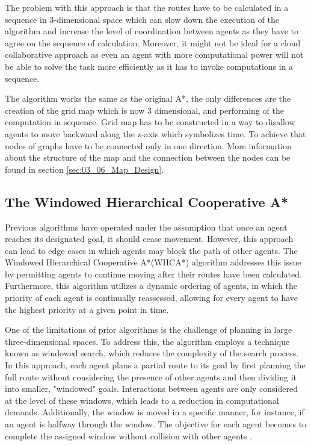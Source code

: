 The problem with this approach is that the routes have to be calculated in a sequence in 3-dimensional space which can slow down the execution of the algorithm and increase the level of coordination between agents as they have to agree on the sequence of calculation. Moreover, it might not be ideal for a cloud collaborative approach as even an agent with more computational power will not be able to solve the task more efficiently as it has to invoke computations in a sequence.

The algorithm works the same as the original A*, the only differences are the creation of the grid map which is now 3 dimensional, and  performing of the computation in sequence. Grid map has to be constructed in a way to disallow agents to move backward along the z-axis which symbolizes time. To achieve that nodes of graphs have to be connected only in one direction. More information about the structure of the map and the connection between the nodes can be found in section \ref{sec:03_06_Map_Design}.

\subsection{The Windowed Hierarchical Cooperative A*}
Previous algorithms have operated under the assumption that once an agent reaches its designated goal, it should cease movement. However, this approach can lead to edge cases in which agents may block the path of other agents. The Windowed Hierarchical Cooperative A*(WHCA*) algorithm addresses this issue by permitting agents to continue moving after their routes have been calculated. Furthermore, this algorithm utilizes a dynamic ordering of agents, in which the priority of each agent is continually reassessed, allowing for every agent to have the highest priority at a given point in time.

One of the limitations of prior algorithms is the challenge of planning in large three-dimensional spaces. To address this, the algorithm employs a technique known as windowed search, which reduces the complexity of the search process. In this approach, each agent plans a partial route to its goal by first planning the full route without considering the presence of other agents and then dividing it into smaller, "windowed" goals. Interactions between agents are only considered at the level of these windows, which leads to a reduction in computational demands. Additionally, the window is moved in a specific manner, for instance, if an agent is halfway through the window. The objective for each agent becomes to complete the assigned window without collision with other agents \cite{whca}\cite{path_adv}.

